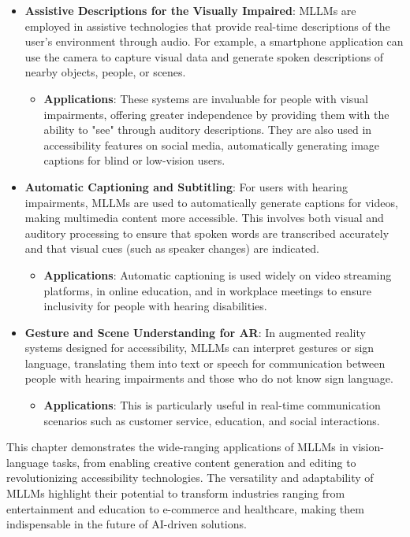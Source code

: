 \begin{itemize}
    \item \textbf{Assistive Descriptions for the Visually Impaired}: MLLMs are employed in assistive technologies that provide real-time descriptions of the user's environment through audio. For example, a smartphone application can use the camera to capture visual data and generate spoken descriptions of nearby objects, people, or scenes.
    \begin{itemize}
        \item \textbf{Applications}: These systems are invaluable for people with visual impairments, offering greater independence by providing them with the ability to "see" through auditory descriptions. They are also used in accessibility features on social media, automatically generating image captions for blind or low-vision users.
    \end{itemize}
    \item \textbf{Automatic Captioning and Subtitling}: For users with hearing impairments, MLLMs are used to automatically generate captions for videos, making multimedia content more accessible. This involves both visual and auditory processing to ensure that spoken words are transcribed accurately and that visual cues (such as speaker changes) are indicated.
    \begin{itemize}
        \item \textbf{Applications}: Automatic captioning is used widely on video streaming platforms, in online education, and in workplace meetings to ensure inclusivity for people with hearing disabilities.
    \end{itemize}
    \item \textbf{Gesture and Scene Understanding for AR}: In augmented reality systems designed for accessibility, MLLMs can interpret gestures or sign language, translating them into text or speech for communication between people with hearing impairments and those who do not know sign language.
    \begin{itemize}
        \item \textbf{Applications}: This is particularly useful in real-time communication scenarios such as customer service, education, and social interactions.
    \end{itemize}
\end{itemize}

This chapter demonstrates the wide-ranging applications of MLLMs in vision-language tasks, from enabling creative content generation and editing to revolutionizing accessibility technologies. The versatility and adaptability of MLLMs highlight their potential to transform industries ranging from entertainment and education to e-commerce and healthcare, making them indispensable in the future of AI-driven solutions.

